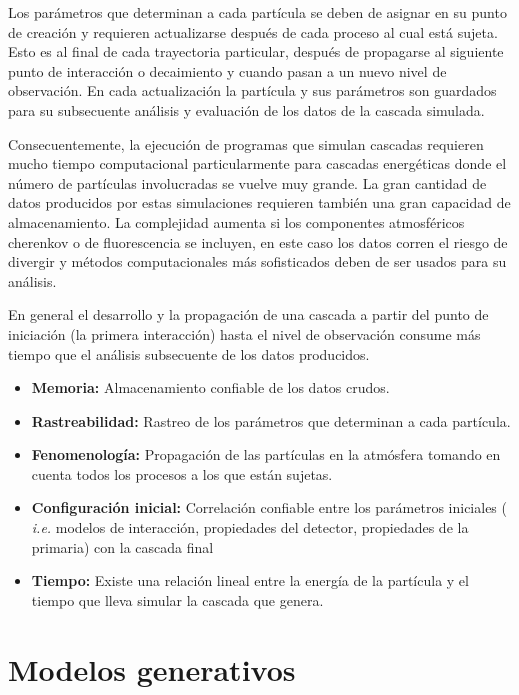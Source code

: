 Los parámetros que determinan a cada partícula se deben de asignar en su punto de creación y requieren actualizarse después de cada proceso al cual está sujeta. Esto es al final de cada trayectoria particular, después de propagarse al siguiente punto de interacción o decaimiento y cuando pasan a un nuevo nivel de observación. En cada actualización la partícula y sus parámetros son guardados para su subsecuente análisis y evaluación de los datos de la cascada simulada.

Consecuentemente, la ejecución de programas que simulan cascadas requieren mucho tiempo computacional  particularmente para cascadas energéticas donde el número de partículas involucradas se vuelve muy grande. La gran cantidad de datos producidos por estas simulaciones requieren también una gran capacidad de almacenamiento. La complejidad aumenta si los componentes atmosféricos cherenkov o de fluorescencia se incluyen, en este caso los datos corren el riesgo de divergir y métodos computacionales más sofisticados deben de ser usados para su análisis.

En general el desarrollo y la propagación de una cascada a partir del punto de iniciación (la primera interacción) hasta  el nivel de observación consume más tiempo que el análisis subsecuente de los datos producidos.

\begin{itemize}
    \item \textbf{Memoria:} Almacenamiento confiable de los datos crudos.
    \item \textbf{Rastreabilidad:} Rastreo de los parámetros que determinan a cada partícula.
    \item \textbf{Fenomenología:} Propagación de las partículas en la atmósfera tomando en cuenta todos los procesos a los que están sujetas.
    \item \textbf{Configuración inicial:} Correlación confiable entre los parámetros iniciales ( \emph{i.e.} modelos de interacción, propiedades del detector, propiedades de la primaria) con la cascada final
    \item \textbf{Tiempo:} Existe una relación lineal entre la energía de la partícula y el tiempo que lleva simular la cascada que genera.
\end{itemize}

\section{Modelos generativos}

